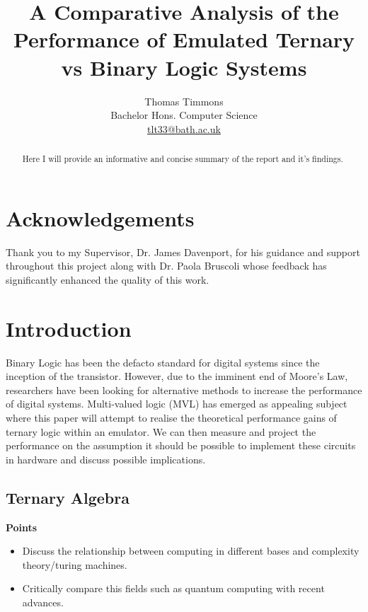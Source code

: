 \documentclass[12pt]{article}
\title{\textbf{A Comparative Analysis of the Performance of Emulated Ternary vs Binary Logic Systems}}
\author{
    Thomas Timmons\\
    Bachelor Hons. Computer Science\\
    \href{mailto:tlt33@bath.ac.uk}{tlt33@bath.ac.uk}
}
\begin{document}
\maketitle

\begin{abstract}
    Here I will provide an informative and concise summary of the report and it's findings.
\end{abstract}

\newpage

\tableofcontents

\newpage

\section*{Acknowledgements}

Thank you to my Supervisor, Dr. James Davenport, for his guidance and support throughout this project along with 
Dr. Paola Bruscoli whose feedback has significantly enhanced the quality of this work.\\

\newpage

\section{Introduction}

Binary Logic has been the defacto standard for digital systems since the inception of the transistor. However, due to the 
imminent end of Moore's Law, researchers have been looking for alternative methods to increase the performance of digital
systems. Multi-valued logic (MVL) has emerged as appealing subject where this paper will attempt to realise the theoretical 
performance gains of ternary logic within an emulator. We can then measure and project the performance on the assumption 
it should be possible to implement these circuits in hardware and discuss possible implications.


\subsection{Ternary Algebra}

\textbf{Points}
\begin{itemize}
    \item Discuss the relationship between computing in different bases and complexity theory/turing machines.
    \item Critically compare this fields such as quantum computing with recent advances.
\end{itemize}
\end{document}
